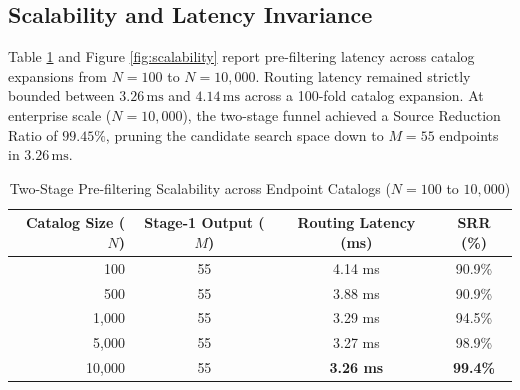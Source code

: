 \documentclass[fleqn,10pt]{article}
\begin{document}
\subsection{Scalability and Latency Invariance}
Table \ref{tab:scalability_measured} and Figure \ref{fig:scalability} report pre-filtering latency across catalog expansions from $N = 100$ to $N = 10{,}000$. Routing latency remained strictly bounded between $3.26\,\text{ms}$ and $4.14\,\text{ms}$ across a 100-fold catalog expansion. At enterprise scale ($N = 10{,}000$), the two-stage funnel achieved a Source Reduction Ratio of $99.45\%$, pruning the candidate search space down to $M = 55$ endpoints in $3.26\,\text{ms}$.

\begin{table}[t]
\centering
\caption{Two-Stage Pre-filtering Scalability across Endpoint Catalogs ($N = 100$ to $10{,}000$)}
\label{tab:scalability_measured}
\begin{tabular}{rccc}
\toprule
\textbf{Catalog Size ($N$)} & \textbf{Stage-1 Output ($M$)} & \textbf{Routing Latency (ms)} & \textbf{SRR (\%)} \\
\midrule
100    & 55 & 4.14 ms & 90.9\% \\
500    & 55 & 3.88 ms & 90.9\% \\
1,000  & 55 & 3.29 ms & 94.5\% \\
5,000  & 55 & 3.27 ms & 98.9\% \\
10,000 & 55 & \textbf{3.26 ms} & \textbf{99.4\%} \\
\bottomrule
\end{tabular}
\end{table}
\end{document}
